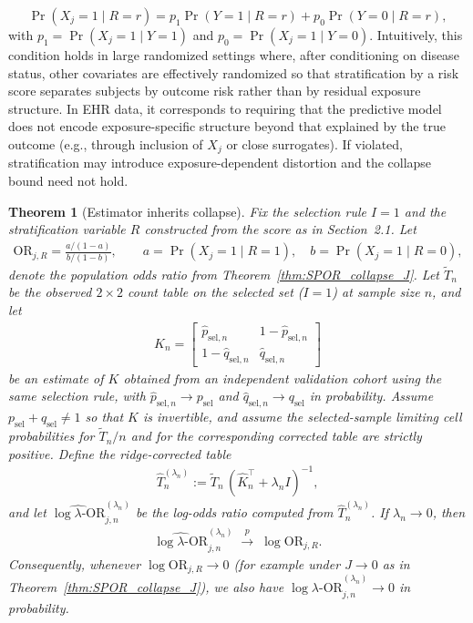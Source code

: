 \documentclass[pdflatex,sn-mathphys-num]{sn-jnl}%
\def\EQSP{3pt}
\newcommand{\cgather}[2][\EQSP]{\begingroup\setlength\abovedisplayskip{#1}\setlength\belowdisplayskip{#1}\begin{gather} #2 \end{gather}\endgroup\noindent}
\theoremstyle{thmstyleone}%
\newtheorem{theorem}{Theorem}%
\theoremstyle{thmstyletwo}%
\theoremstyle{thmstylethree}%
\begin{document}
\[
\Pr(X_j=1 \mid R=r)
=
p_1 \Pr(Y=1 \mid R=r)
+
p_0 \Pr(Y=0 \mid R=r),
\]
with $p_1=\Pr(X_j=1\mid Y=1)$ and $p_0=\Pr(X_j=1\mid Y=0)$. Intuitively, this condition holds in large randomized settings where, after conditioning on disease status, other covariates are effectively randomized so that stratification by a risk score separates subjects by outcome risk rather than by residual exposure structure. In EHR data, it corresponds to requiring that the predictive model does not encode exposure-specific structure beyond that explained by the true outcome (e.g., through inclusion of $X_j$ or close surrogates). If violated, stratification may introduce exposure-dependent distortion and the collapse bound need not hold.
%
\begin{theorem}[Estimator  inherits collapse]\label{thm:inherit_collapse}
Fix the selection rule $I=1$ and the stratification variable $R$ constructed from the score as in Section~2.1.
Let
\cgather{
\mathrm{OR}_{j,R}
=
\frac{a/(1-a)}{b/(1-b)},
\qquad
a=\Pr(X_j=1\mid R=1),\quad b=\Pr(X_j=1\mid R=0),
}
denote the population odds ratio from Theorem~\ref{thm:SPOR_collapse_J}.
%
Let $\tilde T_n$ be the observed $2\times2$ count table on the selected set ($I=1$) at sample size $n$, and let
\cgather{
\hat K_n=
\begin{bmatrix}
\hat p_{\mathrm{sel},n} & 1-\hat p_{\mathrm{sel},n}\\
1-\hat q_{\mathrm{sel},n} & \hat q_{\mathrm{sel},n}
\end{bmatrix}
}
be an estimate of $K$ obtained from an independent validation cohort using the same selection rule, with
$\hat p_{\mathrm{sel},n}\to p_{\mathrm{sel}}$ and $\hat q_{\mathrm{sel},n}\to q_{\mathrm{sel}}$ in probability.
Assume $p_{\mathrm{sel}}+q_{\mathrm{sel}}\neq 1$ so that $K$ is invertible, and assume the selected-sample limiting cell probabilities for
$\tilde T_n/n$ and for the corresponding corrected table are strictly positive.
%
Define the ridge-corrected table
\cgather{
\hat T^{(\lambda_n)}_n := \tilde T_n\,(\hat K_n^\top+\lambda_n I)^{-1},
}
and let $\widehat{\log\lambda\text{-OR}}_{j,n}^{(\lambda_n)}$ be the log-odds ratio computed from $\hat T^{(\lambda_n)}_n$. If $\lambda_n\to 0$, then
\cgather{
\widehat{\log\lambda\text{-OR}}_{j,n}^{(\lambda_n)} \;\xrightarrow{p}\; \log \mathrm{OR}_{j,R}.
}
Consequently, whenever $\log \mathrm{OR}_{j,R}\to 0$ (for example under $J\to 0$ as in Theorem~\ref{thm:SPOR_collapse_J}),
we also have $\widehat{\log\lambda\text{-OR}}_{j,n}^{(\lambda_n)}\to 0$ in probability.
\end{theorem}
\end{document}

